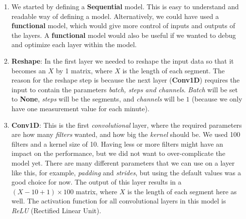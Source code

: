 \begin{enumerate}
      \item We started by defining a \textbf{Sequential} model. This is easy to understand and readable way of defining a model. Alternatively, we could have used a \textbf{functional} model, which would give more control of inputs and outputs of the layers. A \textbf{functional} model would also be useful if we wanted to debug and optimize each layer within the model. 
      
      \item \textbf{Reshape}: In the first layer we needed to reshape the input data so that it becomes an $X$ by 1 matrix, where $X$ is the length of each segment. The reason for the reshape step is because the next layer (\textbf{Conv1D}) requires the input to contain the parameters \textit{batch, steps and channels}. \textit{Batch} will be set to \textbf{None}, \textit{steps} will be the segments, and \textit{channels} will be $1$ (because we only have one measurement value for each minute).
      
      \item \textbf{Conv1D}: This is the first \textit{convolutional} layer, where the required parameters are how many \textit{filters} wanted, and how big the \textit{kernel} should be. We used 100 filters and a kernel size of 10. Having less or more filters might have an impact on the performance, but we did not want to over-complicate the model yet. There are many different parameters that we can use on a layer like this, for example, \textit{padding} and \textit{strides}, but using the default values was a good choice for now. The output of this layer results in a $(X-10+1) \times 100$ matrix, where $X$ is the length of each segment here as well. The activation function for all convolutional layers in this model is \textit{ReLU} (Rectified Linear Unit). 


\end{enumerate}

